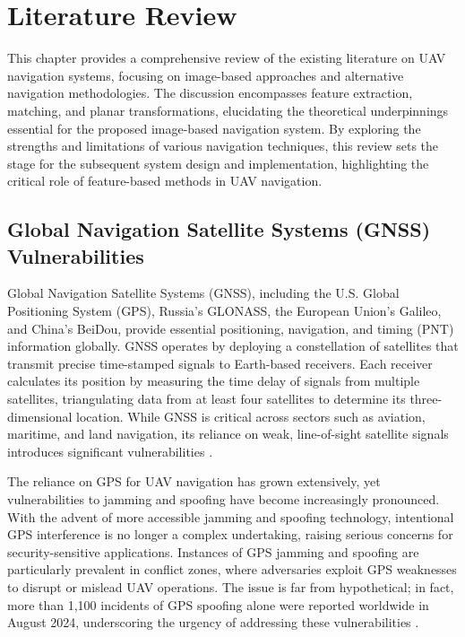 
\chapter{Literature Review}


This chapter provides a comprehensive review of the existing literature on UAV navigation systems, focusing on image-based approaches and alternative navigation methodologies. The discussion encompasses feature extraction, matching, and planar transformations, elucidating the theoretical underpinnings essential for the proposed image-based navigation system. By exploring the strengths and limitations of various navigation techniques, this review sets the stage for the subsequent system design and implementation, highlighting the critical role of feature-based methods in UAV navigation.



\section{Global Navigation Satellite Systems (GNSS) Vulnerabilities}


Global Navigation Satellite Systems (GNSS), including the U.S. Global Positioning System (GPS), Russia's GLONASS, the European Union's Galileo, and China’s BeiDou, provide essential positioning, navigation, and timing (PNT) information globally. GNSS operates by deploying a constellation of satellites that transmit precise time-stamped signals to Earth-based receivers. Each receiver calculates its position by measuring the time delay of signals from multiple satellites, triangulating data from at least four satellites to determine its three-dimensional location. While GNSS is critical across sectors such as aviation, maritime, and land navigation, its reliance on weak, line-of-sight satellite signals introduces significant vulnerabilities \cite{geotab2024gps}.

The reliance on GPS for UAV navigation has grown extensively, yet vulnerabilities to jamming and spoofing have become increasingly pronounced. With the advent of more accessible jamming and spoofing technology, intentional GPS interference is no longer a complex undertaking, raising serious concerns for security-sensitive applications. Instances of GPS jamming and spoofing are particularly prevalent in conflict zones, where adversaries exploit GPS weaknesses to disrupt or mislead UAV operations. The issue is far from hypothetical; in fact, more than 1,100 incidents of GPS spoofing alone were reported worldwide in August 2024, underscoring the urgency of addressing these vulnerabilities \cite{khalil2024gnss}.

